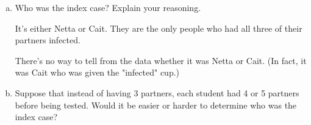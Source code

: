 \begin{enumerate}[(a)]
\item Who was the index case?  Explain your reasoning.

\TextEntry


\begin{AnswerText}
It's either Netta or Cait.  They are the only people who had all three of their partners infected.

There's no way to tell from the data whether it was Netta or Cait.  (In fact, it was Cait who was given the "infected" cup.)

\end{AnswerText}

\item Suppose that instead of having 3 partners, each student had 4 or 5 partners before being tested.  Would it be easier or harder to determine who was the index case?

\TextEntry

\end{enumerate}
